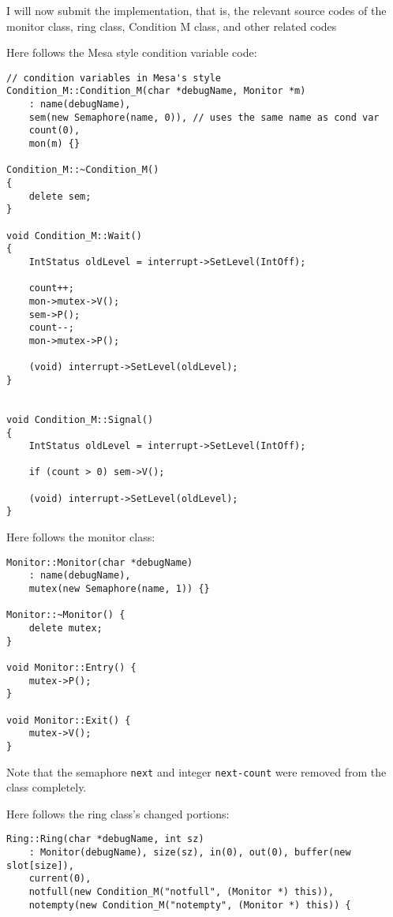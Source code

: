 \documentclass[11pt]{article}
\begin{document}
\begin{question}

    I will now submit the implementation, that is, the relevant source codes of the monitor class, ring class, Condition M class, and other related codes

    Here follows the Mesa style condition variable code:

    \begin{verbatim}
// condition variables in Mesa's style
Condition_M::Condition_M(char *debugName, Monitor *m)
    : name(debugName),
    sem(new Semaphore(name, 0)), // uses the same name as cond var
    count(0),
    mon(m) {}

Condition_M::~Condition_M()
{
    delete sem;
}

void Condition_M::Wait()
{
    IntStatus oldLevel = interrupt->SetLevel(IntOff);

    count++;
    mon->mutex->V();
    sem->P();
    count--;
    mon->mutex->P();

    (void) interrupt->SetLevel(oldLevel);
}


void Condition_M::Signal()
{
    IntStatus oldLevel = interrupt->SetLevel(IntOff);

    if (count > 0) sem->V();

    (void) interrupt->SetLevel(oldLevel);
}
    \end{verbatim}

    Here follows the monitor class:

    \begin{verbatim}
Monitor::Monitor(char *debugName)
    : name(debugName),
    mutex(new Semaphore(name, 1)) {}

Monitor::~Monitor() {
    delete mutex;
}

void Monitor::Entry() {
    mutex->P();
}

void Monitor::Exit() {
    mutex->V();
}
    \end{verbatim}

    Note that the semaphore {\tt next} and integer {\tt next-count} were removed from the class completely.

    Here follows the ring class's changed portions:

    \begin{verbatim}
Ring::Ring(char *debugName, int sz)
    : Monitor(debugName), size(sz), in(0), out(0), buffer(new slot[size]),
    current(0),
    notfull(new Condition_M("notfull", (Monitor *) this)),
    notempty(new Condition_M("notempty", (Monitor *) this)) {


\end{verbatim}
\end{question}
\end{document}

